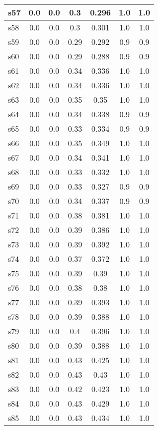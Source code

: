 \documentclass{article}
\begin{document}
\begin{tabular}{|l|c|c|c|c|c|c|}
\hline
s57 &0.0 & 0.0 & 0.3 & 0.296 & 1.0 & 1.0\\
\hline
s58 &0.0 & 0.0 & 0.3 & 0.301 & 1.0 & 1.0\\
\hline
s59 &0.0 & 0.0 & 0.29 & 0.292 & 0.9 & 0.9\\
\hline
s60 &0.0 & 0.0 & 0.29 & 0.288 & 0.9 & 0.9\\
\hline
s61 &0.0 & 0.0 & 0.34 & 0.336 & 1.0 & 1.0\\
\hline
s62 &0.0 & 0.0 & 0.34 & 0.336 & 1.0 & 1.0\\
\hline
s63 &0.0 & 0.0 & 0.35 & 0.35 & 1.0 & 1.0\\
\hline
s64 &0.0 & 0.0 & 0.34 & 0.338 & 0.9 & 0.9\\
\hline
s65 &0.0 & 0.0 & 0.33 & 0.334 & 0.9 & 0.9\\
\hline
s66 &0.0 & 0.0 & 0.35 & 0.349 & 1.0 & 1.0\\
\hline
s67 &0.0 & 0.0 & 0.34 & 0.341 & 1.0 & 1.0\\
\hline
s68 &0.0 & 0.0 & 0.33 & 0.332 & 1.0 & 1.0\\
\hline
s69 &0.0 & 0.0 & 0.33 & 0.327 & 0.9 & 0.9\\
\hline
s70 &0.0 & 0.0 & 0.34 & 0.337 & 0.9 & 0.9\\
\hline
s71 &0.0 & 0.0 & 0.38 & 0.381 & 1.0 & 1.0\\
\hline
s72 &0.0 & 0.0 & 0.39 & 0.386 & 1.0 & 1.0\\
\hline
s73 &0.0 & 0.0 & 0.39 & 0.392 & 1.0 & 1.0\\
\hline
s74 &0.0 & 0.0 & 0.37 & 0.372 & 1.0 & 1.0\\
\hline
s75 &0.0 & 0.0 & 0.39 & 0.39 & 1.0 & 1.0\\
\hline
s76 &0.0 & 0.0 & 0.38 & 0.38 & 1.0 & 1.0\\
\hline
s77 &0.0 & 0.0 & 0.39 & 0.393 & 1.0 & 1.0\\
\hline
s78 &0.0 & 0.0 & 0.39 & 0.388 & 1.0 & 1.0\\
\hline
s79 &0.0 & 0.0 & 0.4 & 0.396 & 1.0 & 1.0\\
\hline
s80 &0.0 & 0.0 & 0.39 & 0.388 & 1.0 & 1.0\\
\hline
s81 &0.0 & 0.0 & 0.43 & 0.425 & 1.0 & 1.0\\
\hline
s82 &0.0 & 0.0 & 0.43 & 0.43 & 1.0 & 1.0\\
\hline
s83 &0.0 & 0.0 & 0.42 & 0.423 & 1.0 & 1.0\\
\hline
s84 &0.0 & 0.0 & 0.43 & 0.429 & 1.0 & 1.0\\
\hline
s85 &0.0 & 0.0 & 0.43 & 0.434 & 1.0 & 1.0\\

\end{tabular}
\end{document}
